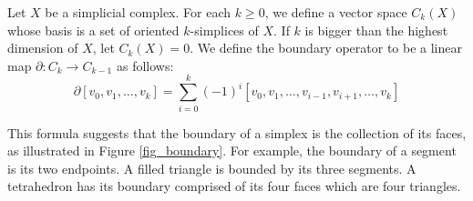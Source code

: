 \documentclass[conference]{IEEEtran}
\begin{document}
Let $X$ be a simplicial complex. For each $k \geq 0$, we define a vector
space $C_k(X)$ whose basis is a set of oriented $k$-simplices of
$X$. If $k$ is bigger than the highest dimension of $X$, let $C_k(X) =
0$. We define the boundary operator to be a linear map $\partial : C_k \to
C_{k-1}$ as follows:
\begin{equation*}
\partial[v_0, v_1, \ldots, v_k] = \sum_{i = 0}^{k} (-1)^{i}[v_0, v_1, \ldots, v_{i-1}, v_{i+1}, \ldots, v_k]
\end{equation*}

This formula suggests that the boundary of a simplex is the collection of its
faces, as illustrated in Figure \ref{fig_boundary}. For example,
the boundary of a segment is its two endpoints. A filled triangle is
bounded by its three segments. A tetrahedron has its boundary comprised
of its four faces which are four triangles.
\end{document}
